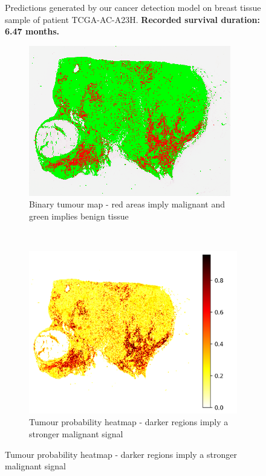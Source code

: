 \documentclass{l4proj}
\begin{document}
\begin{appendices}
\begin{figure}[h]
    \caption{Predictions generated by our cancer detection model on breast tissue sample of patient TCGA-AC-A23H. \textbf{Recorded survival duration: 6.47 months.}}
    \label{fig:TCGA-AC-A23H}
\end{figure}



\begin{figure}[hbt!]
    \centering
    \begin{subfigure}[b]{0.4\textwidth}
        \includegraphics[scale=0.7]{images/appendix_b/TCGA-GM-A2DA-mss.png}
        \caption{Binary tumour map - red areas imply malignant and green implies benign tissue}
    \end{subfigure}\hfill%
    ~~
    \begin{subfigure}[b]{0.4\textwidth}
        \includegraphics[scale=0.55]{images/appendix_b/TCGA-GM-A2DA-mmi.png}
        \caption{Tumour probability heatmap - darker regions imply a stronger malignant signal}
    \end{subfigure}


\end{figure}
\end{appendices}
\end{document}
